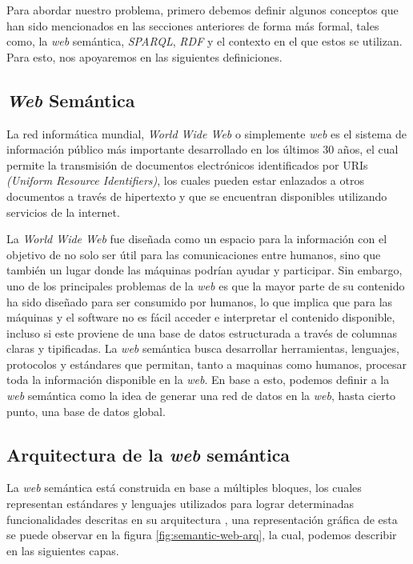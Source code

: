
Para abordar nuestro problema, primero debemos definir algunos conceptos que han
sido mencionados en las secciones anteriores de forma más formal, tales como, la
\textit{web} semántica, \textit{SPARQL}, \textit{RDF} y el contexto en el que
estos se utilizan. Para esto, nos apoyaremos en las siguientes definiciones.

\subsection{\textit{Web} Semántica}

La red informática mundial, \textit{World Wide Web} o simplemente \textit{web}
es el sistema de información público más importante desarrollado en los últimos
30 años, el cual permite la transmisión de documentos electrónicos identificados
por URIs \textit{(Uniform Resource Identifiers)}, los cuales pueden estar
enlazados a otros documentos a través de hipertexto y que se encuentran
disponibles utilizando servicios de la internet.

La \textit{World Wide Web} fue diseñada como un espacio para la información con
el objetivo de no solo ser útil para las comunicaciones entre humanos, sino que
también un lugar donde las máquinas podrían ayudar y participar. Sin embargo,
uno de los principales problemas de la \textit{web} es que la mayor parte de su
contenido ha sido diseñado para ser consumido por humanos, lo que implica que
para las máquinas y el software no es fácil acceder e interpretar el contenido
disponible, incluso si este proviene de una base de datos estructurada a través
de columnas claras y tipificadas. La \textit{web} semántica busca desarrollar
herramientas, lenguajes, protocolos y estándares que permitan, tanto a maquinas
como humanos, procesar toda la información disponible en la \textit{web}. En
base a esto, podemos definir a la \textit{web} semántica como la idea de generar
una red de datos en la \textit{web}, hasta cierto punto, una base de datos
global.
\cite{berners1998semantic}

\subsection{Arquitectura de la \textit{web} semántica}

La \textit{web} semántica está construida en base a múltiples bloques, los
cuales representan estándares y lenguajes utilizados para lograr determinadas
funcionalidades descritas en su arquitectura \cite{harth2011semantic}, una
representación gráfica de esta se puede observar en la figura
\ref{fig:semantic-web-arq}, la cual, podemos describir en las siguientes capas.

